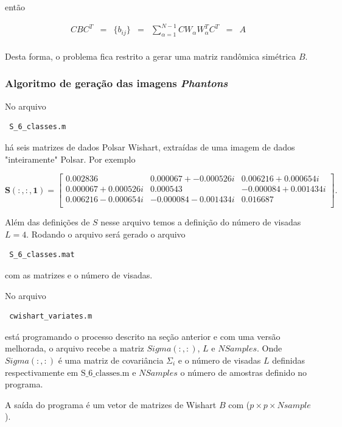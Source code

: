 \documentclass[12pt,a4paper]{article}
\begin{document}
então

\begin{equation}\label{eqn119}
\begin{array}{ccccccc}
	CBC^{T}&=&\{b_{ij}\}&=&\sum_{\alpha=1}^{N-1}CW_{\alpha}W_{\alpha}^{T}C^{T}&=&A \\
\end{array}
\end{equation}

Desta forma, o problema fica restrito a gerar uma matriz randômica simétrica $B$.

\subsubsection{Algoritmo de geração das imagens {\it Phantons}} 

 No arquivo \begin{verbatim} S_6_classes.m \end{verbatim} há seis matrizes de dados Polsar Wishart, extraídas de uma imagem de dados "inteiramente" Polsar. Por exemplo  

$$
\mathbf{S(:, :, 1)} = \left[
\begin{array}{lll}
	0.002836  &0.000067+-0.000526i &0.006216+0.000654i\\
	0.000067+0.000526i &0.000543 & -0.000084+0.001434i\\
	0.006216-0.000654i& -0.000084-0.001434i & 0.016687\\
\end{array}
\right].
$$

Além das definições de $S$ nesse arquivo temos a definição do número de visadas $L=4$. Rodando o arquivo será gerado o arquivo \begin{verbatim} S_6_classes.mat \end{verbatim} com as matrizes e o número de visadas.

No arquivo \begin{verbatim} cwishart_variates.m \end{verbatim} está programando o processo descrito na seção anterior e com uma versão melhorada, o arquivo recebe a matriz  $Sigma(:,:)$, $L$ e  $NSamples$. Onde $Sigma(:,:)$ é uma matriz de covariância $\Sigma_i$ e o número de visadas $L$ definidas respectivamente em $\mbox{S\_6\_classes.m}$ e $NSamples$ o número de amostras definido no programa.

A saída do programa é um vetor de matrizes  de Wishart $B$ com ($p\times p \times Nsample$). 
\end{document}
